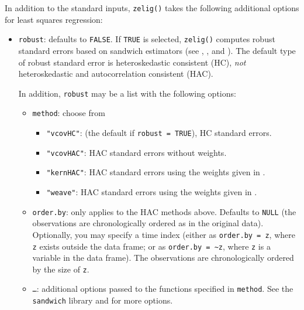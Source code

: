 In addition to the standard inputs, {\tt zelig()} takes the following
additional options for least squares regression:  
\begin{itemize}
\item {\tt robust}: defaults to {\tt FALSE}.  If {\tt TRUE} is
selected, {\tt zelig()} computes robust standard errors based on
sandwich estimators (see \cite{Zeileis04}, \cite{Huber81}, and
\cite{White80}).  The default type of robust standard error is
heteroskedastic consistent (HC), \emph{not} heteroskedastic and
autocorrelation consistent (HAC).  

In addition, {\tt robust} may be a list with the following options:  
\begin{itemize}
\item {\tt method}:  choose from 
\begin{itemize}
\item {\tt "vcovHC"}: (the default if {\tt robust = TRUE}), HC standard errors.
\item {\tt "vcovHAC"}: HAC standard errors without weights.  
\item {\tt "kernHAC"}: HAC standard errors using the weights given in
\cite{Andrews91}.   
\item {\tt "weave"}: HAC standard errors using the weights given in
\cite{LumHea99}.
\end{itemize} 
\item {\tt order.by}: only applies to the HAC methods above.  Defaults to
{\tt NULL} (the observations are chronologically ordered as in the
original data).  Optionally, you may specify a time index (either as
{\tt order.by = z}, where {\tt z} exists outside the data frame; or
as {\tt order.by = \~{}z}, where {\tt z} is a variable in the data
frame).  The observations are chronologically ordered by the size of
{\tt z}.
\item {\tt \dots}:  additional options passed to the functions
specified in {\tt method}.  See the {\tt sandwich} library and
\cite{Zeileis04} for more options.   
\end{itemize}
\end{itemize}


